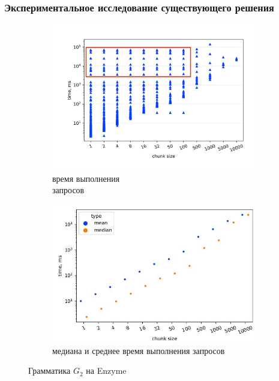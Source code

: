 \documentclass{beamer}
\begin{document}
\begin{frame}
\transwipe[direction=90]
 \frametitle{Экспериментальное исследование существующего решения}
    \begin{figure}[H]
    \begin{subfigure}[b]{0.5\textwidth}
    \centering
    \includegraphics[width=\textwidth]{pictures/subclass_old.pdf_1.jpg} \caption{время выполнения \\ запросов}
    \label{3}
    \end{subfigure}%
    \begin{subfigure}[b]{0.5\textwidth}
    \centering
    \includegraphics[width=\columnwidth]{pictures/subclass_old_mean&median.pdf_1.jpg} \caption{медиана и среднее время выполнения запросов}
    \label{4}
    \end{subfigure} \caption{Грамматика $G_2$ на Enzyme}
    \label{old2}
    \end{figure}
\end{frame}
\end{document}
